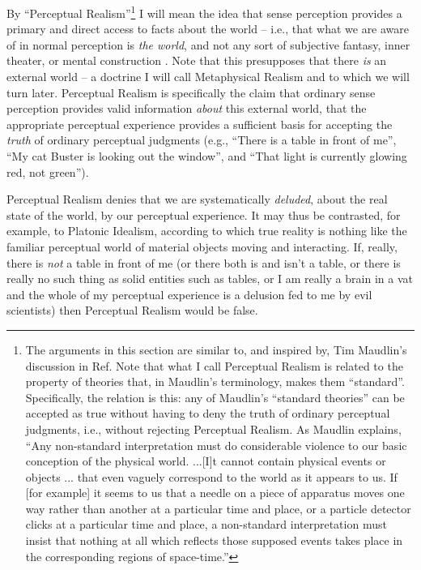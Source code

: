 \documentclass[12pt]{article}
\begin{document}
By ``Perceptual Realism''\footnote{The 
  arguments in this section are similar to, and inspired
  by, Tim Maudlin's discussion in Ref. \cite{maudlin}  
  Note that what I call Perceptual Realism is related to the
  property of theories that, in Maudlin's terminology, makes them
  ``standard''.  Specifically, the relation is this:  any of Maudlin's
  ``standard theories'' can be accepted as true without having to deny
  the truth of ordinary perceptual judgments, i.e., without rejecting
  Perceptual Realism.  As Maudlin explains, ``Any non-standard
  interpretation must do considerable violence to our basic conception
  of the physical world.  ...[I]t cannot contain physical events or
  objects ... that even vaguely correspond to the world as it appears
  to us.  If [for example] it seems to us that a needle on a piece of
  apparatus moves one way rather than another at a particular time and
  place, or a particle detector clicks at a particular time and place,
  a non-standard interpretation must insist that nothing at all which
  reflects those supposed events takes place in the corresponding
  regions of space-time.''}
I will mean the idea that sense perception
provides a primary and direct access to facts about the world -- i.e.,
that
what we are aware of in normal perception is \emph{the world}, and not
any sort of subjective fantasy, inner theater, or mental construction \cite{kelley}.  
Note
that this presupposes that there \emph{is} an external world -- a
doctrine I will call Metaphysical Realism and to which we will turn
later.  Perceptual Realism is specifically the claim that ordinary
sense perception provides valid information \emph{about} this 
external world, that
the appropriate perceptual experience provides a sufficient basis for
accepting the \emph{truth} of ordinary perceptual judgments (e.g., 
``There is a table in front of me'', ``My cat Buster is looking out 
the window'', and ``That light is currently glowing red, not
green'').  


Perceptual Realism denies that we are
systematically \emph{deluded}, about the real state of the world, by 
our perceptual experience.  It may thus be contrasted, for example, to
Platonic Idealism, according to which true reality is 
nothing like the familiar perceptual world of material objects moving
and interacting.  If, really, there is \emph{not} a table in front of
me (or there both is and isn't a table, or there is really no such
thing as solid entities such as tables, or I am really a brain in a
vat and the whole of my perceptual experience is a delusion fed to me
by evil scientists) then Perceptual Realism would be false.
\end{document}
